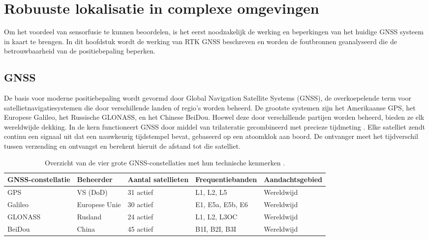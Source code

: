 
\section{Robuuste lokalisatie in complexe omgevingen}
\label{sec:lokalisatie}

Om het voordeel van sensorfusie te kunnen beoordelen, is het eerst noodzakelijk de werking en beperkingen van het huidige GNSS systeem in kaart te brengen. In dit hoofdstuk wordt de werking van RTK GNSS beschreven en worden de foutbronnen geanalyseerd die de betrouwbaarheid van de positiebepaling beperken.

\subsection{GNSS}

De basis voor moderne positiebepaling wordt gevormd door Global Navigation Satellite Systems (GNSS), de overkoepelende term voor satellietnavigatiesystemen die door verschillende landen of regio's worden beheerd. De grootste systemen zijn het Amerikaanse GPS, het Europese Galileo, het Russische GLONASS, en het Chinese BeiDou. Hoewel deze door verschillende partijen worden beheerd, bieden ze elk wereldwijde dekking. In de kern functioneert GNSS door middel van trilateratie gecombineerd met precieze tijdmeting \cite{GNSSConstellations2026} \cite{gps_distance}. Elke satelliet zendt continu een signaal uit dat een nauwkeurig tijdstempel bevat, gebaseerd op een atoomklok aan boord. De ontvanger meet het tijdverschil tussen verzending en ontvangst en berekent hieruit de afstand tot die satelliet. 

\begin{table}[htbp]
    \centering
    \renewcommand{\arraystretch}{1.3}
    \caption{Overzicht van de vier grote GNSS-constellaties met hun technische kenmerken \cite{novatel_constellations}.}
    \label{tab:gnss_overzicht}
    \begin{tabularx}{\textwidth}{|l|l|l|l|X|}
        \hline
        \rowcolor{green!20}
        \textbf{GNSS-constellatie} & \textbf{Beheerder} & \textbf{Aantal satellieten} & \textbf{Frequentiebanden} & \textbf{Aandachtsgebied} \\ \hline
        GPS                        & VS (DoD)           & 31 actief                   & L1, L2, L5                & Wereldwijd               \\ \hline
        Galileo                    & Europese Unie      & 30 actief                   & E1, E5a, E5b, E6          & Wereldwijd               \\ \hline
        GLONASS                    & Rusland            & 24 actief                   & L1, L2, L3OC              & Wereldwijd \\ \hline
        BeiDou                     & China              & 45 actief                         & B1I, B2I, B3I             & Wereldwijd               \\ \hline
    \end{tabularx}
\end{table}

